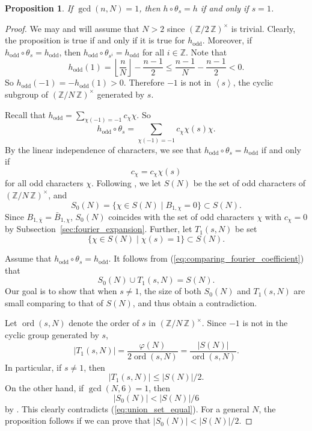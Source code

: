 \documentclass{amsart}[11pt]
\newtheorem{prop}[thm]{Proposition}
\theoremstyle{definition}
\numberwithin{equation}{section}
\theoremstyle{notitle}
\begin{document}
\begin{prop} \label{prop:arithmetic-results-rigidity-of-h}
If $\gcd(n,N)=1$, then $h\circ \theta_s=h$ if and only if $s=1$. 
\end{prop}

\begin{proof} We may and will assume that $N> 2$ since ${(\mathbb{Z}/ {2}\, \mathbb{Z})^\times}$ is
  trivial.  Clearly, the proposition is true if and only if it is true
  for $h_{\mathrm{odd}}$. Moreover, if $h_{\mathrm{odd}} \circ
  \theta_s=h_{\mathrm{odd}}$, then $h_{\mathrm{odd}}\circ \theta_{s^i}= h_{\mathrm{odd}}$ for all
  $i\in{\mathbb{Z}}$. Note that 
  \[ h_{\mathrm{odd}}(1)= {\left\lfloor {\frac{n}{N}} \right\rfloor}-\frac{n-1}{2}\leq
  \frac{n-1}{N}-\frac{n-1}{2}<0.\] So $h_{\mathrm{odd}}(-1)=
  -h_{\mathrm{odd}}(1)>0$. Therefore $-1$ is not in ${\left\langle {s} \right\rangle}$, the cyclic
  subgroup of ${(\mathbb{Z}/ {N}\, \mathbb{Z})^\times}$ generated by $s$.

  Recall that $h_{\mathrm{odd}}= \sum_{\chi(-1)=-1} c_\chi \chi$.  So 
\[ h_{\mathrm{odd}}\circ \theta_s = \sum_{\chi(-1)=-1} c_\chi \chi(s) \chi.\]
By the linear independence of characters, we see that $h_{\mathrm{odd}}\circ
\theta_s =h_{\mathrm{odd}}$ if and only if 
\begin{equation}
  \label{eq:comparing_fourier_coefficient}
 c_\chi = c_\chi \chi(s)
\end{equation}
for all odd characters $\chi$.
Following \cite[Proposition, p.~1190]{MR511556}, we let $S(N)$ be the
set of odd characters of ${(\mathbb{Z}/ {N}\, \mathbb{Z})^\times}$, and 
\[ S_0(N)= \{\chi \in S(N) \mid B_{1, \chi}=0\} \subset S(N). \] Since $B_{1,
  \bar{\chi}}= \bar{B}_{1, \chi}$, $S_0(N)$ coincides with the
set of odd characters $\chi$ with $c_\chi=0$ by
Subsection~\ref{sec:fourier_expansion}.  Further, let $T_1(s,N)$ be
 set 
\[\{ \chi\in S(N)\mid  \chi(s)=1\}  \subset S(N).\]

Assume that $h_{\mathrm{odd}}\circ \theta_s=h_{\mathrm{odd}}$.  It follows from
(\ref{eq:comparing_fourier_coefficient}) that 
\begin{equation}
  \label{eq:union_set_equal}
  S_0(N)\cup T_1(s,N)= S(N).
\end{equation}
Our goal is to show that when $s\neq 1$, the size of both $S_0(N)$ and
$T_1(s,N)$ are small comparing to that of $S(N)$, and thus obtain
a contradiction. 

Let $\operatorname{ord}(s, N)$ denote the order of $s$ in ${(\mathbb{Z}/ {N}\, \mathbb{Z})^\times}$. Since $-1$ is
not in the cyclic group generated by $s$, 
\[{\lvert {T_1(s,N)} \rvert}= \frac{\varphi(N)}{2\operatorname{ord}(s,N)}=\frac{{\lvert {S(N)} \rvert}}{\operatorname{ord}(s,N)}.\]
In particular, if $s\neq 1$, then 
\[ {\lvert {T_1(s,N)} \rvert} \leq {\lvert {S(N)} \rvert}/2.\]
On the other hand, if $\gcd(N, 6)=1$, then 
\[ {\lvert {S_0(N)} \rvert}< {{\lvert {S(N)} \rvert}}/6\]
by \cite[Proposition, p.~1190]{MR511556}.  This clearly contradicts
(\ref{eq:union_set_equal}). For a general $N$, the proposition follows
if we can prove that ${\lvert {S_0(N)} \rvert}<{\lvert {S(N)} \rvert}/2$. 
\end{proof}
\end{document}
